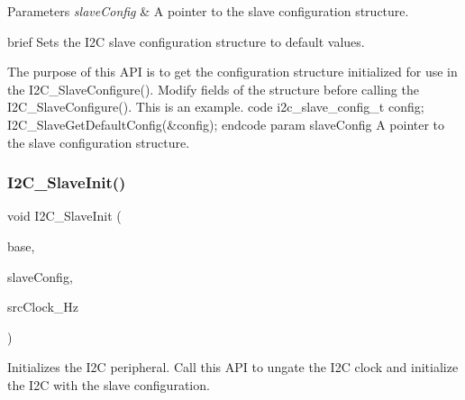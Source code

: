 \begin{DoxyParams}{Parameters}
{\em slave\+Config} & A pointer to the slave configuration structure.\\
\hline
\end{DoxyParams}
brief Sets the I2C slave configuration structure to default values.

The purpose of this A\+PI is to get the configuration structure initialized for use in the I2\+C\+\_\+\+Slave\+Configure(). Modify fields of the structure before calling the I2\+C\+\_\+\+Slave\+Configure(). This is an example. code i2c\+\_\+slave\+\_\+config\+\_\+t config; I2\+C\+\_\+\+Slave\+Get\+Default\+Config(\&config); endcode param slave\+Config A pointer to the slave configuration structure. \mbox{\label{group__i2c__driver_gaf2397a88554ea896f212dd262f9bc731}} 
\subsubsection{\texorpdfstring{I2C\_SlaveInit()}{I2C\_SlaveInit()}}
{\footnotesize\ttfamily void I2\+C\+\_\+\+Slave\+Init (\begin{DoxyParamCaption}\item[{\mbox{\hyperlink{struct_i2_c___type}{I2\+C\+\_\+\+Type}} $\ast$}]{base,  }\item[{const \mbox{\hyperlink{group__i2c__driver_gaa70dd0ec9815617269569190efd2de5d}{i2c\+\_\+slave\+\_\+config\+\_\+t}} $\ast$}]{slave\+Config,  }\item[{uint32\+\_\+t}]{src\+Clock\+\_\+\+Hz }\end{DoxyParamCaption})}



Initializes the I2C peripheral. Call this A\+PI to ungate the I2C clock and initialize the I2C with the slave configuration. 

